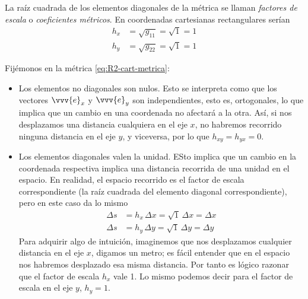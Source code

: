 La raíz cuadrada de los elementos diagonales de la métrica se llaman
\emph{factores de escala} o \emph{coeficientes métricos}.
En coordenadas cartesianas rectangulares serían
\begin{align*}
  h_x &= \sqrt{g_{11}} = \sqrt{1} = 1\\
  h_y &= \sqrt{g_{22}} = \sqrt{1} = 1  
\end{align*}

Fijémonos en la métrica \eqref{eq:R2-cart-metrica}:
\begin{itemize}
\item Los elementos no diagonales son nulos. Esto se interpreta como que los
  vectores $\vvv{e}_x$ y $\vvv{e}_y$ son independientes, esto es, ortogonales,
  lo que implica que un cambio en una coordenada no afectará a la otra.
  Así, si nos desplazamos una distancia cualquiera en el eje $x$, no habremos
  recorrido ninguna distancia en el eje $y$, y viceversa, por lo que
  $h_{xy}= h_{yx}= 0$.
\item Los elementos diagonales valen la unidad. ESto implica que un cambio en
  la coordenada respectiva implica una distancia recorrida de una unidad en el
  espacio.
  En realidad, el espacio recorrido es el factor de escala correspondiente
  (la raíz cuadrada del elemento diagonal correspondiente), pero en este caso
  da lo mismo
  \begin{subequations}
    \begin{align}
      \Delta s &= h_x\, \Delta x = \sqrt{1}\, \Delta x = \Delta x\\
      \Delta s &= h_y\, \Delta y = \sqrt{1}\, \Delta y = \Delta y
    \end{align}
  \end{subequations}
  Para adquirir algo de intuición, imaginemos que nos desplazamos cualquier distancia en
  el eje $x$, digamos un metro; es fácil entender que en el espacio nos habremos
  desplazado esa misma distancia. Por tanto es lógico razonar que el factor de escala
  $h_x$ vale 1. Lo mismo podemos decir para el factor de escala en el eje $y$, $h_y=1$.
\end{itemize}

